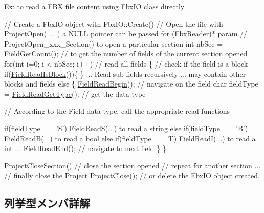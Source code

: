 Ex\+: to read a F\+BX file content using \hyperlink{class_fbx_i_o}{Fbx\+IO} class directly 
\begin{DoxyCode}
\textcolor{comment}{// Create a FbxIO object with FbxIO::Create()}
\textcolor{comment}{// Open the file with ProjectOpen( ... ) a NULL pointer can be passed for (FbxReader)* param}
\textcolor{comment}{// ProjectOpen\_xxx\_Section() to open a particular section}
\textcolor{keywordtype}{int} nbSec = \hyperlink{class_fbx_i_o_a03e5080780554283a6ffedb11b8c352a}{FieldGetCount}(); \textcolor{comment}{// to get the number of fields of the current section opened}
\textcolor{keywordflow}{for}(\textcolor{keywordtype}{int} i=0; i < nbSec; i++) \textcolor{comment}{// read all fields}
\{
    \textcolor{comment}{// check if the field is a block}
    \textcolor{keywordflow}{if}(\hyperlink{class_fbx_i_o_ac9c7d089db2f954f947e5b97a23e6f89}{FieldReadIsBlock}())\{ \} ... Read sub fields recursively ... may contain other blocks 
      and fields
    \textcolor{keywordflow}{else}
    \{
        \hyperlink{class_fbx_i_o_a0e7e1a7e91b4f5ae33e4bcf93cf315cf}{FieldReadBegin}();   \textcolor{comment}{// navigate on the field}
        \textcolor{keywordtype}{char} fieldType = \hyperlink{class_fbx_i_o_af4678c1d469f444fe96bead9668f4083}{FieldReadGetType}(); \textcolor{comment}{// get the data type}

        \textcolor{comment}{// According to the Field data type, call the appropriate read functions}

             \textcolor{keywordflow}{if}(fieldType == \textcolor{charliteral}{'S'}) \hyperlink{class_fbx_i_o_af6d036e6ffdf7d66d16f6ff0ae5768f9}{FieldReadS}(...) to read a \textcolor{keywordtype}{string}
        else if(fieldType == 'B') \hyperlink{class_fbx_i_o_a1007e4bf089c93e7f49988fa7087a202}{FieldReadB}(...) to read a \textcolor{keywordtype}{bool}
        else if(fieldType == 'I') \hyperlink{class_fbx_i_o_a6fd89404042ffd3eea33c7295f6717c2}{FieldReadI}(...) to read a \textcolor{keywordtype}{int}
        ... 
        FieldReadEnd(); \textcolor{comment}{// navigate to next field}
    \}
\}

\hyperlink{class_fbx_i_o_a6efa56aa583fc29ddcb2dbffe278bcc2}{ProjectCloseSection}() \textcolor{comment}{// close the section opened}
\textcolor{comment}{// repeat for another section ...}
\textcolor{comment}{// finally close the Project}
ProjectClose(); \textcolor{comment}{// or delete the FbxIO object created.}
\end{DoxyCode}
 

\subsection{列挙型メンバ詳解}
\mbox{\label{class_fbx_i_o_ad0532f36367fa6b750993000dfb8ed1e}} 
